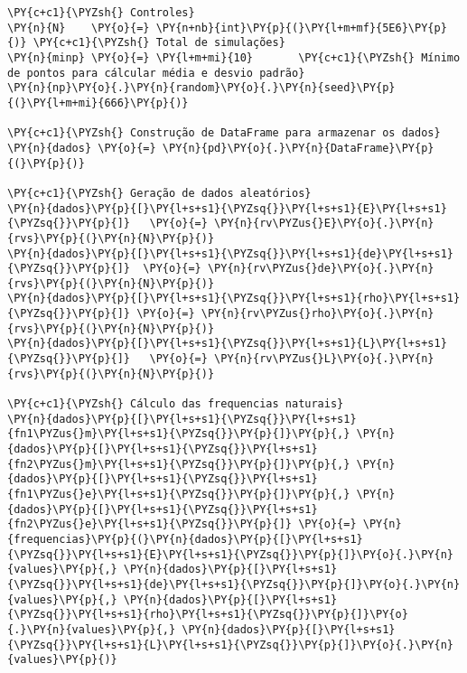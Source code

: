     \begin{tcolorbox}[breakable, size=fbox, boxrule=1pt, pad at break*=1mm,colback=cellbackground, colframe=cellborder]
\begin{Verbatim}[commandchars=\\\{\}]
\PY{c+c1}{\PYZsh{} Controles}
\PY{n}{N}    \PY{o}{=} \PY{n+nb}{int}\PY{p}{(}\PY{l+m+mf}{5E6}\PY{p}{)} \PY{c+c1}{\PYZsh{} Total de simulações}
\PY{n}{minp} \PY{o}{=} \PY{l+m+mi}{10}       \PY{c+c1}{\PYZsh{} Mínimo de pontos para cálcular média e desvio padrão}
\PY{n}{np}\PY{o}{.}\PY{n}{random}\PY{o}{.}\PY{n}{seed}\PY{p}{(}\PY{l+m+mi}{666}\PY{p}{)}

\PY{c+c1}{\PYZsh{} Construção de DataFrame para armazenar os dados}
\PY{n}{dados} \PY{o}{=} \PY{n}{pd}\PY{o}{.}\PY{n}{DataFrame}\PY{p}{(}\PY{p}{)}

\PY{c+c1}{\PYZsh{} Geração de dados aleatórios}
\PY{n}{dados}\PY{p}{[}\PY{l+s+s1}{\PYZsq{}}\PY{l+s+s1}{E}\PY{l+s+s1}{\PYZsq{}}\PY{p}{]}   \PY{o}{=} \PY{n}{rv\PYZus{}E}\PY{o}{.}\PY{n}{rvs}\PY{p}{(}\PY{n}{N}\PY{p}{)}
\PY{n}{dados}\PY{p}{[}\PY{l+s+s1}{\PYZsq{}}\PY{l+s+s1}{de}\PY{l+s+s1}{\PYZsq{}}\PY{p}{]}  \PY{o}{=} \PY{n}{rv\PYZus{}de}\PY{o}{.}\PY{n}{rvs}\PY{p}{(}\PY{n}{N}\PY{p}{)}
\PY{n}{dados}\PY{p}{[}\PY{l+s+s1}{\PYZsq{}}\PY{l+s+s1}{rho}\PY{l+s+s1}{\PYZsq{}}\PY{p}{]} \PY{o}{=} \PY{n}{rv\PYZus{}rho}\PY{o}{.}\PY{n}{rvs}\PY{p}{(}\PY{n}{N}\PY{p}{)}
\PY{n}{dados}\PY{p}{[}\PY{l+s+s1}{\PYZsq{}}\PY{l+s+s1}{L}\PY{l+s+s1}{\PYZsq{}}\PY{p}{]}   \PY{o}{=} \PY{n}{rv\PYZus{}L}\PY{o}{.}\PY{n}{rvs}\PY{p}{(}\PY{n}{N}\PY{p}{)}

\PY{c+c1}{\PYZsh{} Cálculo das frequencias naturais}
\PY{n}{dados}\PY{p}{[}\PY{l+s+s1}{\PYZsq{}}\PY{l+s+s1}{fn1\PYZus{}m}\PY{l+s+s1}{\PYZsq{}}\PY{p}{]}\PY{p}{,} \PY{n}{dados}\PY{p}{[}\PY{l+s+s1}{\PYZsq{}}\PY{l+s+s1}{fn2\PYZus{}m}\PY{l+s+s1}{\PYZsq{}}\PY{p}{]}\PY{p}{,} \PY{n}{dados}\PY{p}{[}\PY{l+s+s1}{\PYZsq{}}\PY{l+s+s1}{fn1\PYZus{}e}\PY{l+s+s1}{\PYZsq{}}\PY{p}{]}\PY{p}{,} \PY{n}{dados}\PY{p}{[}\PY{l+s+s1}{\PYZsq{}}\PY{l+s+s1}{fn2\PYZus{}e}\PY{l+s+s1}{\PYZsq{}}\PY{p}{]} \PY{o}{=} \PY{n}{frequencias}\PY{p}{(}\PY{n}{dados}\PY{p}{[}\PY{l+s+s1}{\PYZsq{}}\PY{l+s+s1}{E}\PY{l+s+s1}{\PYZsq{}}\PY{p}{]}\PY{o}{.}\PY{n}{values}\PY{p}{,} \PY{n}{dados}\PY{p}{[}\PY{l+s+s1}{\PYZsq{}}\PY{l+s+s1}{de}\PY{l+s+s1}{\PYZsq{}}\PY{p}{]}\PY{o}{.}\PY{n}{values}\PY{p}{,} \PY{n}{dados}\PY{p}{[}\PY{l+s+s1}{\PYZsq{}}\PY{l+s+s1}{rho}\PY{l+s+s1}{\PYZsq{}}\PY{p}{]}\PY{o}{.}\PY{n}{values}\PY{p}{,} \PY{n}{dados}\PY{p}{[}\PY{l+s+s1}{\PYZsq{}}\PY{l+s+s1}{L}\PY{l+s+s1}{\PYZsq{}}\PY{p}{]}\PY{o}{.}\PY{n}{values}\PY{p}{)}
\end{Verbatim}
\end{tcolorbox}

